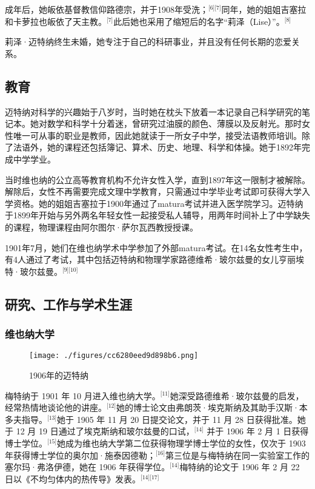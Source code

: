 成年后，她皈依基督教信仰路德宗，并于1908年受洗；\(^\text{[6][7]}\)同年，她的姐姐吉塞拉和卡萝拉也皈依了天主教。\(^\text{[7]}\)此后她也采用了缩短后的名字“莉泽（Lise）”。\(^\text{[8]}\)

莉泽·迈特纳终生未婚，她专注于自己的科研事业，并且没有任何长期的恋爱关系。
\subsection{教育}
迈特纳对科学的兴趣始于八岁时，当时她在枕头下放着一本记录自己科学研究的笔记本。她对数学和科学十分着迷，曾研究过油膜的颜色、薄膜以及反射光。那时女性唯一可从事的职业是教师，因此她就读于一所女子中学，接受法语教师培训。除了法语外，她的课程还包括簿记、算术、历史、地理、科学和体操。她于1892年完成中学学业。

当时维也纳的公立高等教育机构不允许女性入学，直到1897年这一限制才被解除。解除后，女性不再需要完成文理中学教育，只需通过中学毕业考试即可获得大学入学资格。她的姐姐吉塞拉于1900年通过了matura考试并进入医学院学习。迈特纳于1899年开始与另外两名年轻女性一起接受私人辅导，用两年时间补上了中学缺失的课程，物理课程由阿尔图尔·萨尔瓦西教授授课。

1901年7月，她们在维也纳学术中学参加了外部matura考试。在14名女性考生中，有4人通过了考试，其中包括迈特纳和物理学家路德维希·玻尔兹曼的女儿亨丽埃特·玻尔兹曼。\(^\text{[9][10]}\)
\subsection{研究、工作与学术生涯}
\subsubsection{维也纳大学}
\begin{figure}[ht]
\centering
\texttt{[image: ./figures/cc6280eed9d898b6.png]}
\caption{1906年的迈特纳} \label{fig_LZm_2}
\end{figure}
梅特纳于 1901 年 10 月进入维也纳大学。\(^\text{[11]}\)她深受路德维希·玻尔兹曼的启发，经常热情地谈论他的讲座。\(^\text{[12]}\)她的博士论文由弗朗茨·埃克斯纳及其助手汉斯·本多夫指导。\(^\text{[13]}\)她于 1905 年 11 月 20 日提交论文，并于 11 月 28 日获得批准。她于 12 月 19 日通过了埃克斯纳和玻尔兹曼的口试，\(^\text{[14]}\) 并于 1906 年 2 月 1 日获得博士学位。\(^\text{[15]}\)她成为维也纳大学第二位获得物理学博士学位的女性，仅次于 1903 年获得博士学位的奥尔加·施泰因德勒；\(^\text{[16]}\)第三位是与梅特纳在同一实验室工作的塞尔玛·弗洛伊德，她在 1906 年获得学位。\(^\text{[14]}\)梅特纳的论文于 1906 年 2 月 22 日以《不均匀体内的热传导》发表。\(^\text{[14][17]}\)

